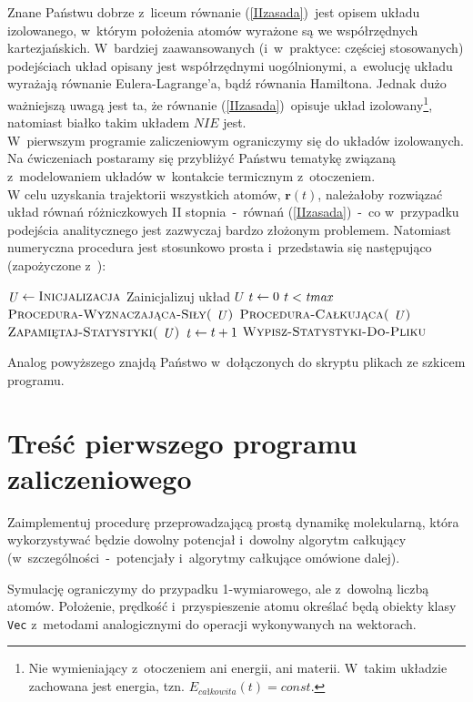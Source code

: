 \documentclass[a4paper,11pt,twoside]{book}
\begin{document}
Znane Państwu dobrze z~liceum równanie (\ref{IIzasada})~jest opisem układu izolowanego, w~którym położenia atomów wyrażone są we współrzędnych kartezjańskich. W~bardziej zaawansowanych (i~w~praktyce: częściej stosowanych) podejściach układ opisany jest współrzędnymi uogólnionymi, a~ewolucję układu wyrażają równanie Eulera-Lagrange'a, bądź równania Hamiltona. Jednak dużo ważniejszą uwagą jest ta, że równanie (\ref{IIzasada})~opisuje układ izolowany\footnote{Nie wymieniający z~otoczeniem ani energii, ani materii. W~takim układzie zachowana jest energia, tzn. $E_{całkowita}(t)=const$.}, natomiast białko takim układem $NIE$ jest.\\

W~pierwszym programie zaliczeniowym ograniczymy się do układów izolowanych. Na ćwiczeniach postaramy się przybliżyć Państwu tematykę związaną z~modelowaniem układów w~kontakcie termicznym z~otoczeniem.\\

W celu uzyskania trajektorii wszystkich atomów, $\mathbf{r}(t)$, należałoby rozwiązać układ równań różniczkowych II stopnia~-~równań (\ref{IIzasada})~-~co w~przypadku podejścia analitycznego jest zazwyczaj bardzo złożonym problemem. Natomiast numeryczna procedura jest stosunkowo prosta i~przedstawia się następująco (zapożyczone z~\cite{understanding}):
\begin{codebox}
	\li $\id{U}\gets\proc{Inicjalizacja}$ 
	\li \Comment Zainicjalizuj układ $U$
	\li $\id{t} \gets 0$
	\li \While $t < \id{tmax}$
	\li \Do
		\li $\proc{Procedura-Wyznaczająca-Siły(\id{U})}$
		\li $\proc{Procedura-Całkująca(\id{U})}$
		\li $\proc{Zapamiętaj-Statystyki(\id{U})}$
		\li $\id{t}\gets t+1$
	\End
	\li $\textnormal{\scshape Wypisz-Statystyki-Do-Pliku}$
\End
\end{codebox}
Analog powyższego znajdą Państwo w~dołączonych do skryptu plikach ze szkicem programu.
\section{Treść pierwszego programu zaliczeniowego}
Zaimplementuj procedurę przeprowadzającą prostą dynamikę molekularną, która wykorzystywać będzie dowolny potencjał i~dowolny algorytm całkujący (w~szczególności~-~potencjały i~algorytmy całkujące omówione dalej).

Symulację ograniczymy do przypadku 1-wymiarowego, ale z~dowolną liczbą atomów. Położenie, prędkość i~przyspieszenie atomu określać będą obiekty klasy \texttt{Vec} z~metodami analogicznymi do operacji wykonywanych na wektorach.
\end{document}
